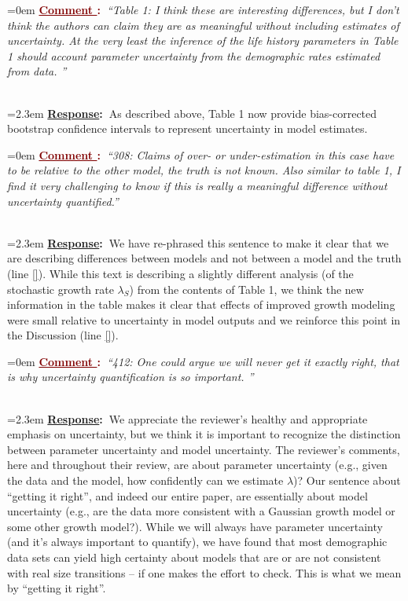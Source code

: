 \documentclass[12pt]{article}
\newcounter{cN}
\newcommand{\comment}[1]{
	\vspace{2em}
	\refstepcounter{cN} %
	\noindent \hangindent=0em \textbf{\textcolor{Maroon}{\uline{Comment \thecN}:~}}\emph{``#1''}
	}
\newcommand{\response}[1]{
	\\[0.25em]
	\hangindent=2.3em \textbf{\textcolor{NavyBlue}{\uline{Response}:~}}#1
	}
\begin{document}
\comment{Table 1: I think these are interesting differences, but I don’t think the authors can claim they are as meaningful without including estimates of uncertainty. At the very least the inference of the life history parameters in Table 1 should account parameter uncertainty from the demographic rates estimated from data. }
\response{As described above, Table 1 now provide bias-corrected bootstrap confidence intervals to represent uncertainty in model estimates.}

\comment{308: Claims of over- or under-estimation in this case have to be relative to the other model, the truth is not known. Also similar to table 1, I find it very challenging to know if this is really a meaningful difference without uncertainty quantified.}
\response{We have re-phrased this sentence to make it clear that we are describing differences between models and not between a model and the truth (line \ref{}). While this text is describing a slightly different analysis (of the stochastic growth rate $\lambda_S$) from the contents of Table 1, we think the new information in the table makes it clear that effects of improved growth modeling were small relative to uncertainty in model outputs and we reinforce this point in the Discussion (line \ref{}).} 

\comment{412: One could argue we will never get it exactly right, that is why uncertainty quantification is so important. }
\response{We appreciate the reviewer's healthy and appropriate emphasis on uncertainty, but we think it is important to recognize the distinction between parameter uncertainty and model uncertainty. The reviewer's comments, here and throughout their review, are about parameter uncertainty (e.g., given the data and the model, how confidently can we estimate $\lambda$)? Our sentence about ``getting it right'', and indeed our entire paper, are essentially about model uncertainty (e.g., are the data more consistent with a Gaussian growth model or some other growth model?). While we will always have parameter uncertainty (and it's always important to quantify), we have found that most demographic data sets can yield high certainty about models that are or are not consistent with real size transitions -- if one makes the effort to check. This is what we mean by ``getting it right''.}
\end{document}
